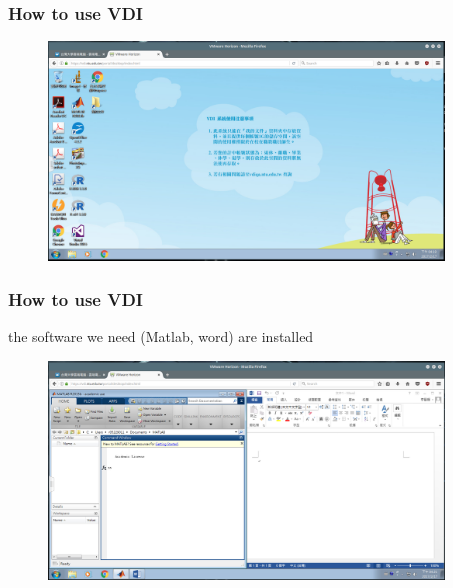 \documentclass [12pt] {beamer}
\begin{document}
    \begin {frame}
        \frametitle {How to use VDI}
        \begin {figure}
        \begin {center}
            \includegraphics [width=10.5cm] {fig3}
        \end {center}
        \end {figure}
    \end {frame}
    \begin {frame}
        \frametitle {How to use VDI}
        the software we need (Matlab, word) are installed
        \begin {figure}
        \begin {center}
            \includegraphics [width=10.5cm] {fig4}
        \end {center}
        \end {figure}
    \end {frame}
\end{document}
